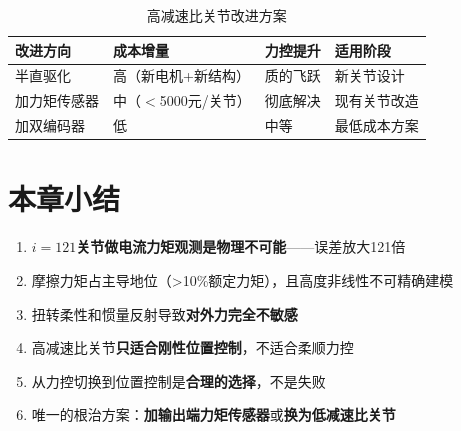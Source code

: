 \begin{table}[H]
\centering
\begin{tabular}{p{3cm}p{3.5cm}p{3.5cm}p{3.5cm}}
\toprule
\textbf{改进方向} & \textbf{成本增量} & \textbf{力控提升} & \textbf{适用阶段} \\
\midrule
半直驱化 & 高（新电机+新结构） & 质的飞跃 & 新关节设计 \\
加力矩传感器 & 中（$<$5000元/关节） & 彻底解决 & 现有关节改造 \\
加双编码器 & 低 & 中等 & 最低成本方案 \\
\bottomrule
\end{tabular}
\caption{高减速比关节改进方案}
\label{tab:improvement}
\end{table}

\section*{本章小结}

\begin{summarybox}{}
\begin{enumerate}
  \item \textbf{$i=121$关节做电流力矩观测是物理不可能}——误差放大121倍
  \item 摩擦力矩占主导地位（>10\%额定力矩），且高度非线性不可精确建模
  \item 扭转柔性和惯量反射导致\textbf{对外力完全不敏感}
  \item 高减速比关节\textbf{只适合刚性位置控制}，不适合柔顺力控
  \item 从力控切换到位置控制是\textbf{合理的选择}，不是失败
  \item 唯一的根治方案：\textbf{加输出端力矩传感器}或\textbf{换为低减速比关节}
\end{enumerate}
\end{summarybox}

\newpage
